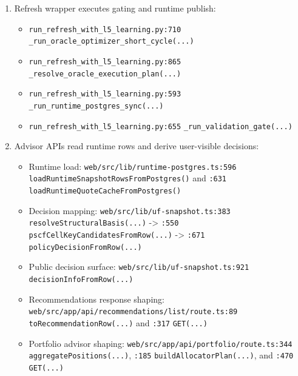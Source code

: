 \documentclass[
]{article}
\providecommand{\tightlist}{%
  \setlength{\itemsep}{0pt}\setlength{\parskip}{0pt}}
\begin{document}
\begin{enumerate}
  \begin{itemize}
  \tightlist
  \item
    \texttt{l5\_policy\_learning\_pipeline.py:1773}
    \texttt{\_merge\_policies(...)}
  \item
    \texttt{l5\_policy\_learning\_pipeline.py:1867}
    \texttt{\_overlay\_anomaly\_profiles(...)}
  \item
    \texttt{l5\_policy\_learning\_pipeline.py:2154}
    \texttt{\_evaluate\_policy(...)}
  \item
    \texttt{l5\_policy\_learning\_pipeline.py:2534}
    \texttt{\_compare\_candidate\_vs\_current(...)} promotion gates
  \item
    \texttt{l5\_policy\_learning\_pipeline.py:2876}
    \texttt{run\_l5\_policy\_learning(...)} orchestrates full L5 cycle
  \end{itemize}
\item
  Refresh wrapper executes gating and runtime publish:

  \begin{itemize}
  \tightlist
  \item
    \texttt{run\_refresh\_with\_l5\_learning.py:710}
    \texttt{\_run\_oracle\_optimizer\_short\_cycle(...)}
  \item
    \texttt{run\_refresh\_with\_l5\_learning.py:865}
    \texttt{\_resolve\_oracle\_execution\_plan(...)}
  \item
    \texttt{run\_refresh\_with\_l5\_learning.py:593}
    \texttt{\_run\_runtime\_postgres\_sync(...)}
  \item
    \texttt{run\_refresh\_with\_l5\_learning.py:655}
    \texttt{\_run\_validation\_gate(...)}
  \end{itemize}
\item
  Advisor APIs read runtime rows and derive user-visible decisions:

  \begin{itemize}
  \tightlist
  \item
    Runtime load: \texttt{web/src/lib/runtime-postgres.ts:596}
    \texttt{loadRuntimeSnapshotRowsFromPostgres()} and \texttt{:631}
    \texttt{loadRuntimeQuoteCacheFromPostgres()}
  \item
    Decision mapping: \texttt{web/src/lib/uf-snapshot.ts:383}
    \texttt{resolveStructuralBasis(...)} -\textgreater{} \texttt{:550}
    \texttt{pscfCellKeyCandidatesFromRow(...)} -\textgreater{}
    \texttt{:671} \texttt{policyDecisionFromRow(...)}
  \item
    Public decision surface: \texttt{web/src/lib/uf-snapshot.ts:921}
    \texttt{decisionInfoFromRow(...)}
  \item
    Recommendations response shaping:
    \texttt{web/src/app/api/recommendations/list/route.ts:89}
    \texttt{toRecommendationRow(...)} and \texttt{:317}
    \texttt{GET(...)}
  \item
    Portfolio advisor shaping:
    \texttt{web/src/app/api/portfolio/route.ts:344}
    \texttt{aggregatePositions(...)}, \texttt{:185}
    \texttt{buildAllocatorPlan(...)}, and \texttt{:470}
    \texttt{GET(...)}
  \end{itemize}
\end{enumerate}
\end{document}
